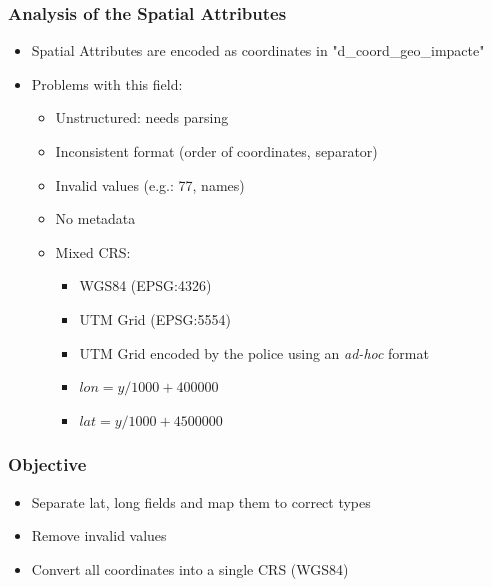 \documentclass[hyperref={pdfpagelabels=true}]{beamer}
\begin{document}
\begin{frame}
\frametitle{Analysis of the Spatial Attributes}
    \begin{itemize}
      \item<1-> Spatial Attributes are encoded as coordinates in "d\_coord\_geo\_impacte"
      \item<2-> Problems with this field:
      \begin{itemize}
	\item<3->Unstructured: needs parsing
	\item<3->Inconsistent format (order of coordinates, separator)	
	\item<3->Invalid values (e.g.: 77, names)
	\item<3->No metadata	
	\item<4->Mixed CRS:
	  \begin{itemize}
	  \item<5->WGS84 (EPSG:4326)
	  \item<5->UTM Grid (EPSG:5554)
	  \item<5->UTM Grid encoded by the police using an \textit{ad-hoc} format
	    \item<6->$lon = y/ 1000 + 400000$
	    \item<6->$lat = y/ 1000 + 4500000$	    
	    \end{itemize}        		  
      \end{itemize}        
    \end{itemize}    
\end{frame}


\begin{frame}
\frametitle{Objective}
\begin{itemize}
  \item<1->Separate lat, long fields and map them to correct types
  \item<1->Remove invalid values  
  \item<1->Convert all coordinates into a single CRS (WGS84)
\end{itemize}
\end{frame}
\end{document}
